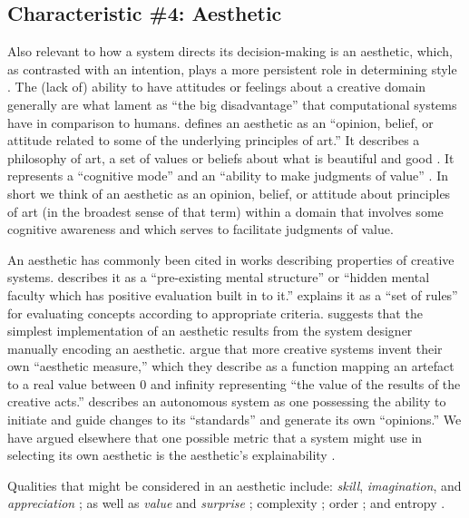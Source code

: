 \documentclass[phd,electronic,oneside,twosidetoc,letterpaper,chaptercenter,parttop,lol,lof,lot]{byumsphd}
\begin{document}
\subsection{Characteristic \#4: Aesthetic}

Also relevant to how a system directs its decision-making is an aesthetic, which, as contrasted with an intention, plays a more persistent role in determining style \citep{Koren2010WhichDefinitions}. The (lack of) ability to have attitudes or feelings about a creative domain generally are what \cite{Papadopoulos1999} lament as ``the big disadvantage'' that computational systems have in comparison to humans. \cite{Koren2010WhichDefinitions} defines an aesthetic as an ``opinion, belief, or attitude related to some of the underlying principles of art.'' It describes a philosophy of art, a set of values or beliefs about what is beautiful and good \citep{Mothersill2004}. It represents a ``cognitive mode'' and an ``ability to make judgments of value'' \citep{Koren2010WhichDefinitions}. In short we think of an aesthetic as an opinion, belief, or attitude about principles of art (in the broadest sense of that term) within a domain that involves some cognitive awareness and which serves to facilitate judgments of value.

An aesthetic has commonly been cited in works describing properties of creative systems. \cite{Boden2003TheEdition} describes it as a ``pre-existing mental structure'' or ``hidden mental faculty which has positive evaluation built in to it.'' \cite{Wiggins2006ASystems} explains it as a ``set of rules'' for evaluating concepts according to appropriate criteria. \cite{Ventura2017HowSystem} suggests that the simplest implementation of an aesthetic results from the system designer manually encoding an aesthetic. \cite{Colton2011} argue that more creative systems invent their own ``aesthetic measure,'' which they describe as a function mapping an artefact to a real value between 0 and infinity representing ``the value of the results of the creative acts.'' \cite{Jennings2010DevelopingIntelligence} describes an autonomous system as one possessing the ability to initiate and guide changes to its ``standards'' and generate its own ``opinions.'' We have argued elsewhere that one possible metric that a system might use in selecting its own aesthetic is the aesthetic's explainability \citep{Bodily2018ExplainabilitySystems}.

Qualities that might be considered in an aesthetic include: \textit{skill}, \textit{imagination}, and \textit{appreciation} \citep{Colton2008CreativitySystems}; as well as \textit{value} and \textit{surprise} \citep{Boden2003TheEdition}; complexity \citep{Hofstadter1980GodelBach}; order \citep{birkhoff1933aesthetic}; and entropy \citep{shannon2001mathematical}.
\end{document}
